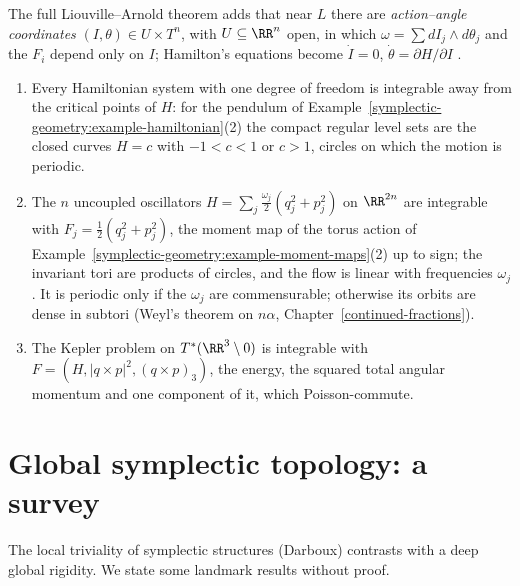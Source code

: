 The full Liouville--Arnold theorem adds that near $L$ there are \emph{action--angle coordinates} $(I, \theta) \in U \times T^n$, with $U \subseteq \RR^n$ open, in which $\omega = \sum dI_j \wedge d\theta_j$ and the $F_i$ depend only
on $I$; Hamilton's equations become $\dot I = 0$, $\dot\theta = \partial H/\partial I$ \cite[Sections 49--50]{arnold-mechanics}.

\begin{example}\label{symplectic-geometry:example-integrable}
\begin{enumerate}
\item Every Hamiltonian system with one degree of freedom is integrable away from the critical points of $H$: for the pendulum of Example~\ref{symplectic-geometry:example-hamiltonian}(2) the compact regular level sets are
the closed curves $H = c$ with $-1 < c < 1$ or $c > 1$, circles on which the motion is periodic.
\item The $n$ uncoupled oscillators $H = \sum_j\frac{\omega_j}{2}(q_j^2 + p_j^2)$ on $\RR^{2n}$ are integrable with $F_j = \frac12(q_j^2 + p_j^2)$, the moment map of the torus action of
Example~\ref{symplectic-geometry:example-moment-maps}(2) up to sign; the invariant tori are products of circles, and the flow is linear with frequencies $\omega_j$. It is periodic only if the $\omega_j$ are commensurable;
otherwise its orbits are dense in subtori (Weyl's theorem on $n\alpha$, Chapter~\ref{continued-fractions}).
\item The Kepler problem on $T^*(\RR^3 \setminus 0)$ is integrable with $F = (H, |q \times p|^2, (q \times p)_3)$, the energy, the squared total angular momentum and one component of it, which Poisson-commute.
\end{enumerate}
\end{example}

\section{Global symplectic topology: a survey}\label{symplectic-geometry:section-survey}

The local triviality of symplectic structures (Darboux) contrasts with a deep global rigidity. We state some landmark results without proof.


